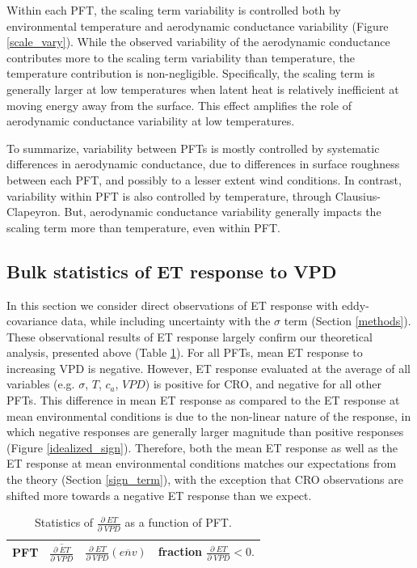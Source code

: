 \documentclass[draft,linenumbers]{agujournal}
\begin{document}
Within each PFT, the scaling term variability is controlled both by environmental temperature and aerodynamic conductance variability (Figure \ref{scale_vary}). While the observed variability of the aerodynamic conductance contributes more to the scaling term variability than temperature, the temperature contribution is non-negligible. Specifically, the scaling term is generally larger at low temperatures when latent heat is relatively inefficient at moving energy away from the surface. This effect amplifies the role of aerodynamic conductance variability at low temperatures.

To summarize, variability between PFTs is mostly controlled by systematic differences in aerodynamic conductance, due to differences in surface roughness between each PFT, and possibly to a lesser extent wind conditions. In contrast, variability within PFT is also controlled by temperature, through Clausius-Clapeyron. But, aerodynamic conductance variability generally impacts the scaling term more than temperature, even within PFT.

\subsection{Bulk statistics of ET response to VPD}
\label{stats_sec}

In this section we consider direct observations of ET response with eddy-covariance data, while including uncertainty with the $\sigma$ term (Section \ref{methods}). These observational results of ET response largely confirm our theoretical analysis, presented above (Table \ref{stats}). For all PFTs, mean ET response to increasing VPD is negative. However, ET response evaluated at the average of all variables (e.g. $\sigma$, $T$, $c_a$, $VPD$) is positive for CRO, and negative for all other PFTs. This difference in mean ET response as compared to the ET response at mean environmental conditions is due to the non-linear nature of the response, in which negative responses are generally larger magnitude than positive responses (Figure \ref{idealized_sign}). Therefore, both the mean ET response as well as the ET response at mean environmental conditions matches our expectations from the theory (Section \ref{sign_term}), with the exception that CRO observations are shifted more towards a negative ET response than we expect.

\begin{table}
\caption{Statistics of $\frac{\partial \; ET}{\partial \; VPD}$ as a function of PFT.}
\centering
\begin{tabular}{l c c c}
  \hline
PFT & $\overline{\frac{\partial \; ET}{\partial \; VPD}}$ & $\frac{\partial \; ET}{\partial \; VPD}\left(\overline{env}\right)$ & fraction $\frac{\partial \; ET}{\partial \; VPD} < 0.$ \\
  \hline
  
  \hline
\end{tabular}
  \label{stats}
\end{table}
\end{document}
